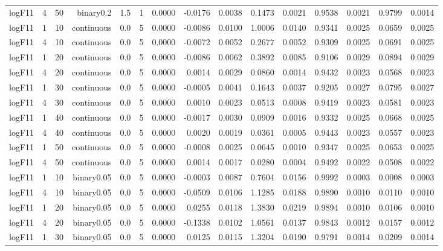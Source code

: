\begin{longtable}{rrrrrrrrrrrrrrr}
  logF11 & 4 & 50 & binary0.2 & 1.5 & 1 & 0.0000 & -0.0176 & 0.0038 & 0.1473 & 0.0021 & 0.9538 & 0.0021 & 0.9799 & 0.0014 \\ 
  logF11 & 1 & 10 & continuous & 0.0 & 5 & 0.0000 & -0.0086 & 0.0100 & 1.0006 & 0.0140 & 0.9341 & 0.0025 & 0.0659 & 0.0025 \\ 
  logF11 & 4 & 10 & continuous & 0.0 & 5 & 0.0000 & -0.0072 & 0.0052 & 0.2677 & 0.0052 & 0.9309 & 0.0025 & 0.0691 & 0.0025 \\ 
  logF11 & 1 & 20 & continuous & 0.0 & 5 & 0.0000 & -0.0086 & 0.0062 & 0.3892 & 0.0085 & 0.9106 & 0.0029 & 0.0894 & 0.0029 \\ 
  logF11 & 4 & 20 & continuous & 0.0 & 5 & 0.0000 & 0.0014 & 0.0029 & 0.0860 & 0.0014 & 0.9432 & 0.0023 & 0.0568 & 0.0023 \\ 
  logF11 & 1 & 30 & continuous & 0.0 & 5 & 0.0000 & -0.0005 & 0.0041 & 0.1643 & 0.0037 & 0.9205 & 0.0027 & 0.0795 & 0.0027 \\ 
  logF11 & 4 & 30 & continuous & 0.0 & 5 & 0.0000 & 0.0010 & 0.0023 & 0.0513 & 0.0008 & 0.9419 & 0.0023 & 0.0581 & 0.0023 \\ 
  logF11 & 1 & 40 & continuous & 0.0 & 5 & 0.0000 & -0.0017 & 0.0030 & 0.0909 & 0.0016 & 0.9332 & 0.0025 & 0.0668 & 0.0025 \\ 
  logF11 & 4 & 40 & continuous & 0.0 & 5 & 0.0000 & 0.0020 & 0.0019 & 0.0361 & 0.0005 & 0.9443 & 0.0023 & 0.0557 & 0.0023 \\ 
  logF11 & 1 & 50 & continuous & 0.0 & 5 & 0.0000 & -0.0008 & 0.0025 & 0.0645 & 0.0010 & 0.9347 & 0.0025 & 0.0653 & 0.0025 \\ 
  logF11 & 4 & 50 & continuous & 0.0 & 5 & 0.0000 & 0.0014 & 0.0017 & 0.0280 & 0.0004 & 0.9492 & 0.0022 & 0.0508 & 0.0022 \\ 
  logF11 & 1 & 10 & binary0.05 & 0.0 & 5 & 0.0000 & -0.0003 & 0.0087 & 0.7604 & 0.0156 & 0.9992 & 0.0003 & 0.0008 & 0.0003 \\ 
  logF11 & 4 & 10 & binary0.05 & 0.0 & 5 & 0.0000 & -0.0509 & 0.0106 & 1.1285 & 0.0188 & 0.9890 & 0.0010 & 0.0110 & 0.0010 \\ 
  logF11 & 1 & 20 & binary0.05 & 0.0 & 5 & 0.0000 & 0.0255 & 0.0118 & 1.3830 & 0.0219 & 0.9894 & 0.0010 & 0.0106 & 0.0010 \\ 
  logF11 & 4 & 20 & binary0.05 & 0.0 & 5 & 0.0000 & -0.1338 & 0.0102 & 1.0561 & 0.0137 & 0.9843 & 0.0012 & 0.0157 & 0.0012 \\ 
  logF11 & 1 & 30 & binary0.05 & 0.0 & 5 & 0.0000 & 0.0125 & 0.0115 & 1.3204 & 0.0190 & 0.9791 & 0.0014 & 0.0209 & 0.0014 \\ 

\end{longtable}
